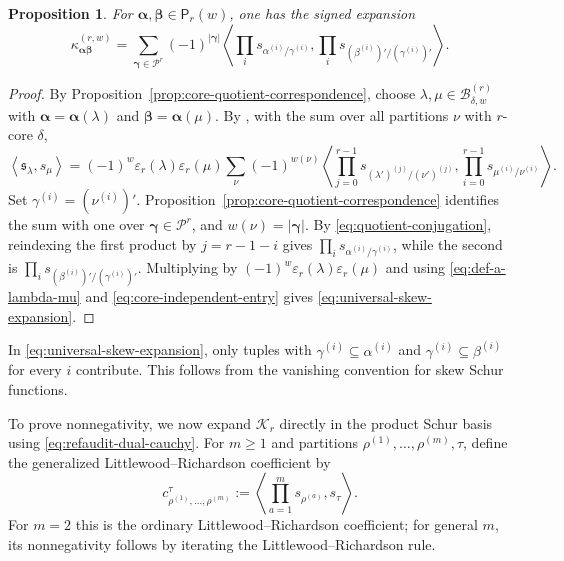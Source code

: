 \documentclass[12pt,reqno,a4paper]{amsart}
\numberwithin{equation}{section}
\numberwithin{figure}{section}
\theoremstyle{plain}
\newtheorem{proposition}[theorem]{Proposition}
\theoremstyle{definition}
\newcommand{\eps}{\varepsilon}
\newcommand{\inner}[2]{\left\langle #1,#2\right\rangle}
\begin{document}
\begin{proposition}
\label{prop:universal-kernel-expansions}
\label{prop:universal-skew-expansion}
For $\boldsymbol\alpha,\boldsymbol\beta\in\mathsf P_r(w)$, one has
the signed expansion
\begin{equation}\label{eq:universal-skew-expansion}
 \kappa^{(r,w)}_{\boldsymbol\alpha\boldsymbol\beta}
 =\sum_{\boldsymbol\gamma\in\mathscr P^r}
  (-1)^{|\boldsymbol\gamma|}
 \inner{
  \prod_i s_{\alpha^{(i)}/\gamma^{(i)}}
 }{
  \prod_i s_{(\beta^{(i)})'/(\gamma^{(i)})'}
 }.
\end{equation}
\end{proposition}

\begin{proof}
By Proposition~\ref{prop:core-quotient-correspondence}, choose
$\lambda,\mu\in\mathcal B_{\delta,w}^{(r)}$
with $\boldsymbol\alpha=\boldsymbol\alpha(\lambda)$ and
$\boldsymbol\beta=\boldsymbol\alpha(\mu)$.
By \cite[Proposition~2.9, p.~586]{Walker}, with the sum over all
partitions $\nu$ with $r$-core $\delta$,
\[
 \inner{\mathfrak{s}_\lambda}{s_\mu}
 =(-1)^w\eps_r(\lambda)\eps_r(\mu)
  \sum_\nu(-1)^{w(\nu)}
  \inner{
   \prod_{j=0}^{r-1}s_{(\lambda')^{(j)}/(\nu')^{(j)}}
  }{
   \prod_{i=0}^{r-1}s_{\mu^{(i)}/\nu^{(i)}}
  }.
\]
Set $\gamma^{(i)}=(\nu^{(i)})'$.
Proposition~\ref{prop:core-quotient-correspondence} identifies the
sum with one over $\boldsymbol\gamma\in\mathscr P^r$, and
$w(\nu)=|\boldsymbol\gamma|$.
By \eqref{eq:quotient-conjugation}, reindexing the first product by
$j=r-1-i$ gives $\prod_i s_{\alpha^{(i)}/\gamma^{(i)}}$,
while the second is
$\prod_i s_{(\beta^{(i)})'/(\gamma^{(i)})'}$.
Multiplying by $(-1)^w\eps_r(\lambda)\eps_r(\mu)$ and using
\eqref{eq:def-a-lambda-mu} and \eqref{eq:core-independent-entry} gives
\eqref{eq:universal-skew-expansion}.
\end{proof}

In \eqref{eq:universal-skew-expansion}, only tuples with
$\gamma^{(i)}\subseteq\alpha^{(i)}$ and
$\gamma^{(i)}\subseteq\beta^{(i)}$ for every $i$ contribute.
This follows from the vanishing convention for skew Schur functions.

To prove nonnegativity, we now expand $\mathcal K_r$ directly in the
product Schur basis using \eqref{eq:refaudit-dual-cauchy}.
For $m\geq1$ and partitions
$\rho^{(1)},\ldots,\rho^{(m)},\tau$, define the generalized
Littlewood--Richardson coefficient by
\[
 c^\tau_{\rho^{(1)},\ldots,\rho^{(m)}}
 :=\inner{\prod_{a=1}^m s_{\rho^{(a)}}}{s_\tau}.
\]
For $m=2$ this is the ordinary Littlewood--Richardson coefficient;
for general $m$, its nonnegativity follows by iterating the
Littlewood--Richardson rule.
\end{document}

